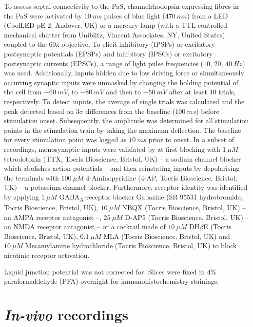 \documentclass[
  12pt,
  a4paper,
  openany]{book}
\begin{document}
To assess septal connectivity to the PaS, channelrhodopsin expressing fibres in the PaS were activated by \(10\ ms\) pulses of blue light (\(470\ nm\)) from a LED (CoolLED pE-2, Andover, UK) or a mercury lamp (with a TTL-controlled mechanical shutter from Uniblitz, Vincent Associates, NY, United States) coupled to the 60x objective. To elicit inhibitory (IPSPs) or excitatory postsynaptic potentials (EPSPs) and inhibitory (IPSCs) or excitatory postsynaptic currents (EPSCs), a range of light pulse frequencies (\(10\), \(20\), \(40\ Hz\)) was used. Additionally, inputs hidden due to low driving force or simultaneously occurring synaptic inputs were unmasked by changing the holding potential of the cell from \(-60\ mV\), to \(-80\ mV\) and then to \(-50\ mV\) after at least \(10\) trials, respectively. To detect inputs, the average of single trials was calculated and the peak detected based on \(3\sigma\) differences from the baseline (\(100\ ms\)) before stimulation onset. Subsequently, the amplitude was determined for all stimulation points in the stimulation train by taking the maximum deflection. The baseline for every stimulation point was logged as \(10\ ms\) prior to onset. In a subset of recordings, monosynaptic inputs were validated by at first blocking with \(1\  \mu M\) tetrodotoxin (TTX, Tocris Bioscience, Bristol, UK) -- a sodium channel blocker which abolishes action potentials -- and then reinstating inputs by depolarising the terminals with \(100\  \mu M\) 4-Aminopyridine (4-AP, Tocris Bioscience, Bristol, UK) -- a potassium channel blocker. Furthermore, receptor identity was identified by applying \(1\ \mu M\) GABA\textsubscript{A}-receptor blocker Gabazine (SR 95531 hydrobromide, Tocris Bioscience, Bristol, UK), \(10\ \mu M\) NBQX (Tocris Bioscience, Bristol, UK) -- an AMPA receptor antagonist --, \(25\ \mu M\) D-AP5 (Tocris Bioscience, Bristol, UK) -- an NMDA receptor antagonist -- or a cocktail made of \(10\ \mu M\) DH\(\beta\)E (Tocris Bioscience, Bristol, UK), \(0.1\ \mu M\) MLA (Tocris Bioscience, Bristol, UK) and \(10\ \mu M\) Mecamylamine hydrochloride (Tocris Bioscience, Bristol, UK) to block nicotinic receptor activation.

Liquid junction potential was not corrected for. Slices were fixed in \(4\%\) paraformaldehyde (PFA) overnight for immunohistochemistry stainings.

\hypertarget{in-vivo-recordings}{%
\section{\texorpdfstring{\emph{In-vivo} recordings}{In-vivo recordings}}\label{in-vivo-recordings}}
\end{document}
